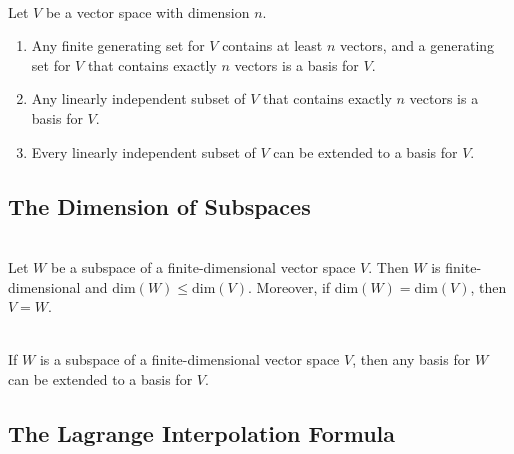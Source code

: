 \begin{corollary}\label{Corollary 1.5}
	\hfill\\
	Let $V$ be a vector space with dimension $n$.
	\begin{enumerate}
		\item Any finite generating set for $V$ contains at least $n$ vectors, and a generating set for $V$ that contains exactly $n$ vectors is a basis for $V$.

		\item Any linearly independent subset of $V$ that contains exactly $n$ vectors is a basis for $V$.

		\item Every linearly independent subset of $V$ can be extended to a basis for $V$.
	\end{enumerate}
\end{corollary}

\subsection*{The Dimension of Subspaces}

\begin{theorem}
	\hfill\\
	Let $W$ be a subspace of a finite-dimensional vector space $V$. Then $W$ is finite-dimensional and $\text{dim}(W) \leq \text{dim}(V)$. Moreover, if $\text{dim}(W) = \text{dim}(V)$, then $V = W$.
\end{theorem}

\begin{corollary}
	\hfill\\
	If $W$ is a subspace of a finite-dimensional vector space $V$, then any basis for $W$ can be extended to a basis for $V$.
\end{corollary}

\subsection*{The Lagrange Interpolation Formula}

